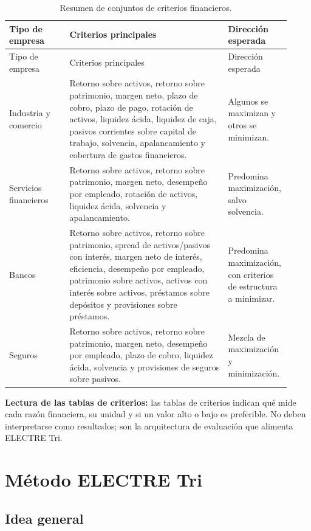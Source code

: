 \documentclass[11pt,a4paper]{article}
\begin{document}
\begin{longtable}{p{0.21\linewidth}p{0.55\linewidth}p{0.16\linewidth}}
\caption{Resumen de conjuntos de criterios financieros.}\label{tab:criterios}\\
\toprule
Tipo de empresa & Criterios principales & Dirección esperada \\
\midrule
\endfirsthead
\toprule
Tipo de empresa & Criterios principales & Dirección esperada \\
\midrule
\endhead
Industria y comercio & Retorno sobre activos, retorno sobre patrimonio, margen neto, plazo de cobro, plazo de pago, rotación de activos, liquidez ácida, liquidez de caja, pasivos corrientes sobre capital de trabajo, solvencia, apalancamiento y cobertura de gastos financieros. & Algunos se maximizan y otros se minimizan. \\
Servicios financieros & Retorno sobre activos, retorno sobre patrimonio, margen neto, desempeño por empleado, rotación de activos, liquidez ácida, solvencia y apalancamiento. & Predomina maximización, salvo solvencia. \\
Bancos & Retorno sobre activos, retorno sobre patrimonio, spread de activos/pasivos con interés, margen neto de interés, eficiencia, desempeño por empleado, patrimonio sobre activos, activos con interés sobre activos, préstamos sobre depósitos y provisiones sobre préstamos. & Predomina maximización, con criterios de estructura a minimizar. \\
Seguros & Retorno sobre activos, retorno sobre patrimonio, margen neto, desempeño por empleado, plazo de cobro, liquidez ácida, solvencia y provisiones de seguros sobre pasivos. & Mezcla de maximización y minimización. \\
\bottomrule
\end{longtable}

\textbf{Lectura de las tablas de criterios:} las tablas de criterios indican qué mide cada razón financiera, su unidad y si un valor alto o bajo es preferible. No deben interpretarse como resultados; son la arquitectura de evaluación que alimenta ELECTRE Tri.

\section{Método ELECTRE Tri}

\subsection{Idea general}
\end{document}
